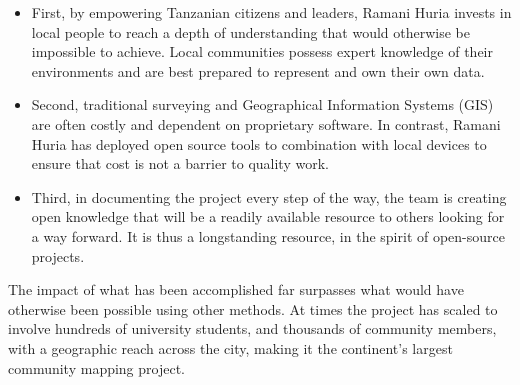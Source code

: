 \documentclass[a4paper,12pt,twoside]{article}
\begin{document}
\begin{mdframed}[hidealllines=true,backgroundcolor=RHgreen!10,innerleftmargin=6pt,innerrightmargin=6pt,leftmargin=-3pt,rightmargin=-3pt]
\begin{itemize}
    \item First, by empowering Tanzanian citizens and leaders, Ramani Huria invests in local people to reach a depth of understanding that would otherwise be impossible to achieve. Local communities possess expert knowledge of their environments and are best prepared to represent and own their own data. 
    \item Second, traditional surveying and Geographical Information Systems (GIS) are often costly and dependent on proprietary software. In contrast, Ramani Huria has deployed open source tools to combination with local devices to ensure that cost is not a barrier to quality work.  
    \item Third, in documenting the project every step of the way, the team is creating open knowledge that will be a readily available resource to others looking for a way forward. It is thus a longstanding resource, in the spirit of open-source projects. 
\end{itemize}
\end{mdframed}

\begin{multicols}{2}

The impact of what has been accomplished far surpasses what would have otherwise been possible using other methods. At times the project has scaled to involve hundreds of university students, and thousands of community members, with a geographic reach across the city, making it the continent's largest community mapping project.
\end{multicols}

\newpage
\end{document}
